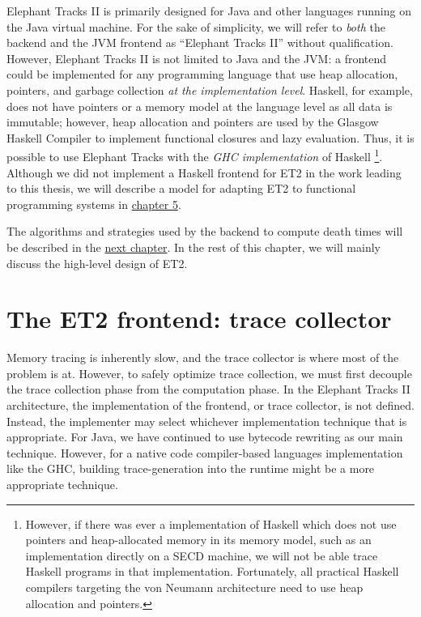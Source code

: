 Elephant Tracks II is primarily designed for Java and other languages running on the Java virtual machine. For the sake of simplicity,
we will refer to \emph{both} the backend and the JVM frontend as ``Elephant Tracks II'' without qualification. However, Elephant Tracks II is not limited
to Java and the JVM: a frontend could be implemented for any programming language that use heap allocation, pointers, and garbage collection
\emph{at the implementation level}. Haskell, for example, does not have pointers or a memory model at the language level as all data is
immutable; however, heap allocation and pointers are used by the Glasgow Haskell Compiler to implement functional closures and lazy evaluation.
Thus, it is possible to use Elephant Tracks with the \emph{GHC implementation} of Haskell \footnote{However, if there was ever a
  implementation of Haskell which does not use pointers and heap-allocated memory in its memory model, such as an implementation
  directly on a SECD machine, we will not be able trace Haskell programs in that implementation. Fortunately, all practical Haskell
  compilers targeting the von Neumann architecture need to use heap allocation and pointers.}. Although we did not implement a Haskell
frontend for ET2 in the work leading to this thesis, we will describe a model for adapting ET2 to functional programming systems in
\hyperref[chap:extensible]{chapter 5}.

The algorithms and strategies used by the backend to compute death times will be described in the \hyperref[chap:algoimp]{next chapter}. In
the rest of this chapter, we will mainly discuss the high-level design of ET2.

\section{The ET2 frontend: trace collector}
Memory tracing is inherently slow, and the trace collector is where most of the problem is at. However, to safely optimize trace collection, we must
first decouple the trace collection phase from the computation phase. In the Elephant Tracks II architecture, the implementation of the
frontend, or trace collector, is not defined. Instead, the implementer may select whichever implementation technique that is appropriate. For Java,
we have continued to use bytecode rewriting as our main technique. However, for a native code compiler-based languages implementation like the GHC,
building trace-generation into the runtime might be a more appropriate technique.


